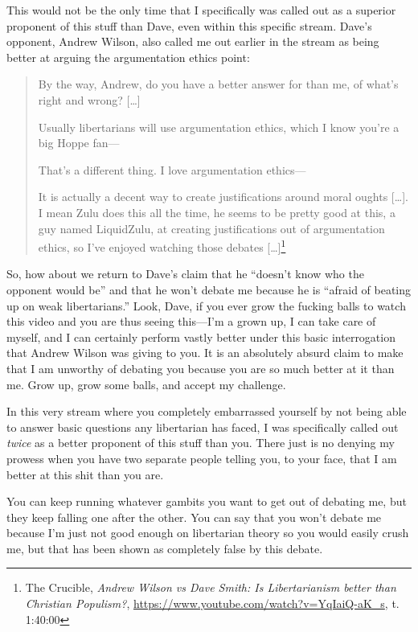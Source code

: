 \documentclass[11pt]{article}
\begin{document}
This would not be the only time that I specifically was called out as a superior proponent of this stuff than Dave, even within this specific stream. Dave's opponent, Andrew Wilson, also called me out earlier in the stream as being better at arguing the argumentation ethics point:
\begin{quote}
By the way, Andrew, do you have a better answer for than me, of what's right and wrong? [\ldots{}]

Usually libertarians will use argumentation ethics, which I know you're a big Hoppe fan---

That's a different thing. I love argumentation ethics---

It is actually a decent way to create justifications around moral oughts [\ldots{}]. I mean Zulu does this all the time, he seems to be pretty good at this, a guy named LiquidZulu, at creating justifications out of argumentation ethics, so I've enjoyed watching those debates [\ldots{}]\footnote{The Crucible, \emph{Andrew Wilson vs Dave Smith: Is Libertarianism better than Christian Populism?}, \url{https://www.youtube.com/watch?v=YqIaiQ-aK\_s}, t. 1:40:00}
\end{quote}

So, how about we return to Dave's claim that he ``doesn't know who the opponent would be'' and that he won't debate me because he is ``afraid of beating up on weak libertarians.'' Look, Dave, if you ever grow the fucking balls to watch this video and you are thus seeing this---I'm a grown up, I can take care of myself, and I can certainly perform vastly better under this basic interrogation that Andrew Wilson was giving to you. It is an absolutely absurd claim to make that I am unworthy of debating you because you are so much better at it than me. Grow up, grow some balls, and accept my challenge.

In this very stream where you completely embarrassed yourself by not being able to answer basic questions any libertarian has faced, I was specifically called out \emph{twice} as a better proponent of this stuff than you. There just is no denying my prowess when you have two separate people telling you, to your face, that I am better at this shit than you are.

You can keep running whatever gambits you want to get out of debating me, but they keep falling one after the other. You can say that you won't debate me because I'm just not good enough on libertarian theory so you would easily crush me, but that has been shown as completely false by this debate.
\end{document}
